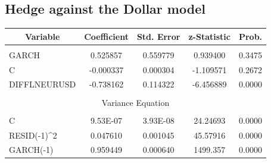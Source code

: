 \documentclass[11pt]{report}
\begin{document}
	\subsection*{Hedge against the Dollar model}
\begin{table}[!h]
\centering
\begin{tabular}{lcccc}
\hline
\multicolumn{1}{|c|}{Variable} & \multicolumn{1}{c|}{Coefficient} & \multicolumn{1}{c|}{Std. Error} & \multicolumn{1}{c|}{z-Statistic} & \multicolumn{1}{c|}{Prob.} \\ \hline
                               & \multicolumn{1}{l}{}             & \multicolumn{1}{l}{}            & \multicolumn{1}{l}{}             & \multicolumn{1}{l}{}       \\
GARCH                          & 0.525857                         & 0.559779                        & 0.939400                         & 0.3475                     \\
C                              & -0.000337                        & 0.000304                        & -1.109571                        & 0.2672                     \\
DIFFLNEURUSD                   & -0.738162                        & 0.114322                        & -6.456889                        & 0.0000                     \\
                               & \multicolumn{1}{l}{}             & \multicolumn{1}{l}{}            & \multicolumn{1}{l}{}             & \multicolumn{1}{l}{}       \\ \hline
\multicolumn{5}{|c|}{Variance Equation}                                                                                                                             \\ \hline
                               & \multicolumn{1}{l}{}             & \multicolumn{1}{l}{}            & \multicolumn{1}{l}{}             & \multicolumn{1}{l}{}       \\
C                              & 9.53E-07                         & 3.93E-08                        & 24.24693                         & 0.0000                     \\
RESID(-1)\textasciicircum 2    & 0.047610                         & 0.001045                        & 45.57916                         & 0.0000                     \\
GARCH(-1)                      & 0.959449                         & 0.000640                        & 1499.357                         & 0.0000                     \\

\end{tabular}
\end{table}
\end{document}
